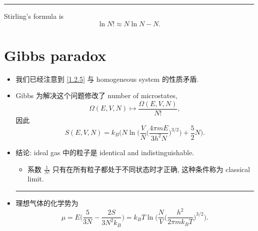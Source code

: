 \begin{itemize}
\begin{tcolorbox}[title=calculation:]
		\noindent\rule[0.5ex]{\linewidth}{0.5pt} %
		
		Stirling's formula is
		\begin{equation}
			\ln N! \approx N \ln N - N.
		\end{equation}
	\end{tcolorbox}
\end{itemize}

\section{Gibbs paradox}
\begin{itemize}
	\item 我们已经注意到 \eqref{1.2.5} 与 homogeneous system 的性质矛盾.
	
	\item Gibbs 为解决这个问题修改了 number of microstates,
	\begin{equation}
		\Omega(E, V, N) \mapsto \frac{\Omega(E, V, N)}{N!},
	\end{equation}
	因此
	\begin{equation}
		S(E, V, N) = k_B \bigg( N \ln \bigg( \frac{V}{N} \Big( \frac{4 \pi m E}{3 h^2 N} \Big)^{3 / 2} \bigg) + \frac{5}{2} N \bigg).
	\end{equation}
	
	\item 结论: ideal gas 中的粒子是 identical and indistinguishable.
	\begin{itemize}
		\item 系数 $\frac{1}{N!}$ 只有在所有粒子都处于不同状态时才正确, 这种条件称为 classical limit.
	\end{itemize}
	
	\noindent\rule[0.5ex]{\linewidth}{0.5pt} %
	
	\item 理想气体的化学势为
	\begin{equation}
		\mu = E \Big( \frac{5}{3 N} - \frac{2 S}{3 N^2 k_B} \Big) = k_B T \ln \Big( \frac{N}{V} \Big( \frac{h^2}{2 \pi m k_B T} \Big)^{3 / 2} \Big).
	\end{equation}
\end{itemize}
